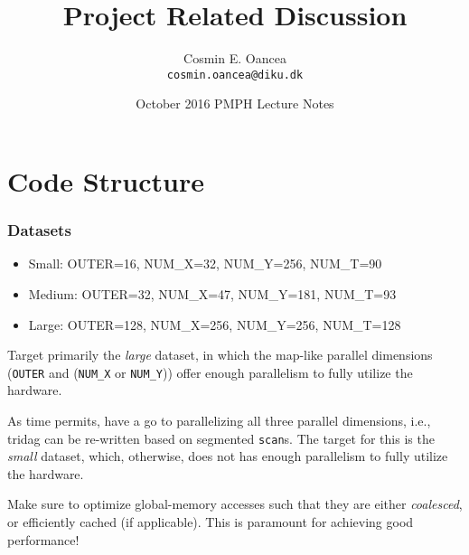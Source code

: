 \documentclass{beamer}
\title[Project]{Project Related Discussion}
\author[C.~Oancea]{Cosmin E. Oancea\\{\tt cosmin.oancea@diku.dk}}
\institute{Department of Computer Science (DIKU)\\University of Copenhagen}
\date[Oct 2016]{October 2016 PMPH Lecture Notes}
\begin{document}
\titleslide


\begin{frame}[fragile]
	\tableofcontents
\end{frame}


\section{Code Structure}

\begin{frame}[fragile,t]
  \frametitle{Datasets} %
\begin{itemize}
    \item{Small:} OUTER=16, NUM\_X=32, NUM\_Y=256, NUM\_T=90\medskip
    \item{Medium:} OUTER=32, NUM\_X=47, NUM\_Y=181, NUM\_T=93\medskip
    \item{Large:} OUTER=128, NUM\_X=256, NUM\_Y=256, NUM\_T=128
\end{itemize}\bigskip

\medskip 
Target primarily the {\em large} dataset, in which the map-like parallel 
dimensions ({\tt OUTER} and ({\tt NUM\_X} or {\tt NUM\_Y})) offer enough 
parallelism to fully utilize the hardware.

\medskip

As time permits, have a go to parallelizing all three parallel dimensions, 
i.e., {\sc tridag} can be re-written based on segmented {\tt scan}s.  
The target for this is the {\em small} dataset, which, otherwise, does not 
has enough parallelism to fully utilize the hardware.

\medskip

\alert{Make sure to optimize global-memory accesses such that they are either {\em coalesced},
or efficiently cached (if applicable). This is paramount for achieving good performance!}

\end{frame}
\end{document}
